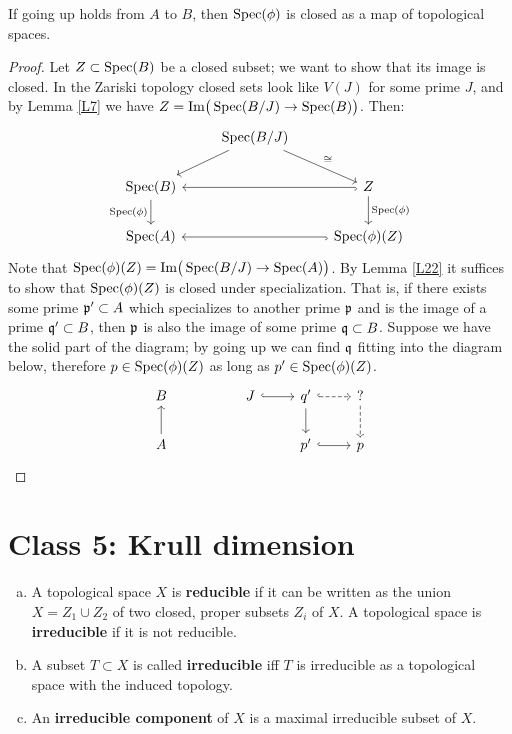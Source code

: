 \documentclass{../mathnotes}
\begin{document}
\begin{lem}
\label{L23}
If going up holds from $A$ to $B$, then $\operatorname{Spec}(\phi)$ is closed as a map of topological spaces.
\end{lem}
\begin{proof}
Let $Z\subset \operatorname{Spec}(B)$ be a closed subset; we want to show that its image is closed. In the Zariski topology closed sets look like $V(J)$ for some prime $J$, and by Lemma \ref{L7} we have $Z = \text{Im} \big(\operatorname{Spec}(B/J) \to \operatorname{Spec}(B) \big)$. Then:
\[
\begin{tikzcd}
\; & \Spec(B/J)\arrow{dl}\arrow{dr}{\cong} & \\
\Spec(B)\arrow{d}[swap]{\Spec(\phi)} & & Z\arrow{d}{\Spec(\phi)}\arrow[hook]{ll} \\
\Spec(A) & & \Spec(\phi)(Z) \arrow[hook]{ll}
\end{tikzcd}
\]
Note that $\operatorname{Spec}(\phi)(Z) = \text{Im}\big(\operatorname{Spec}(B/J) \to \operatorname{Spec}(A)\big)$. By Lemma \ref{L22} it suffices to show that $\operatorname{Spec}(\phi)(Z)$ is closed under specialization. That is, if there exists some prime $\mathfrak p' \subset A$ which specializes to another prime $\mathfrak p$ and is the image of a prime $\mathfrak q' \subset B$, then $\mathfrak p$ is also the image of some prime $\mathfrak q \subset B$. Suppose we have the solid part of the diagram; by going up we can find $\mathfrak q$ fitting into the diagram below, therefore $p\in \operatorname{Spec}(\phi)(Z)$ as long as $p' \in \operatorname{Spec}(\phi)(Z)$.
\[
\begin{tikzcd}
B & & J\arrow[hook]{r} & q'\arrow{d}\arrow[dashed, hook]{r} & ?\arrow[dashed]{d} \\
A\arrow{u} & &   & p'\arrow[hook]{r} & p
\end{tikzcd}
\]
\end{proof}


\section*{Class 5: Krull dimension}

\begin{defn}\hspace{1mm}
\begin{enumerate}[(a)]
\item A topological space $X$ is \textbf{reducible} if it can be written as the union $X=Z_1\cup Z_2$ of two closed, proper subsets $Z_i$ of $X$. A topological space is \textbf{irreducible} if it is not reducible.
\item A subset $T\subset X$ is called \textbf{irreducible} iff $T$ is irreducible as a topological space with the induced topology.
\item An \textbf{irreducible component} of $X$ is a maximal irreducible subset of $X$.
\end{enumerate}
\end{defn}
\end{document}
